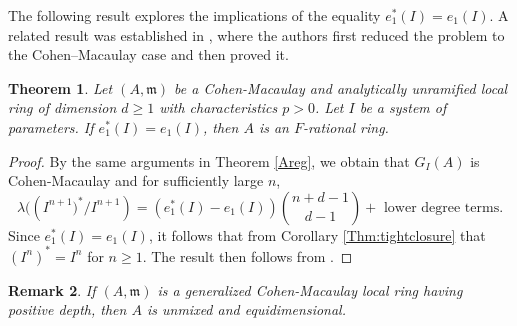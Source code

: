 \documentclass[11pt]{amsart}
\theoremstyle{plain}
\newtheorem{theorem}{Theorem}[section]
\newtheorem{remark}[theorem]{Remark}
\newcommand{\m}{\mathfrak{m}}
\theoremstyle{plain}
\begin{document}
The following result explores the implications of the equality ${e}^*_1(I)=e_1(I).$ A related result was established in \cite[Corollary 4.6]{saipriya}, where the authors first reduced the problem to the Cohen–Macaulay case and then proved it.
\begin{theorem}
\label{Frational}
     Let $(A,\m)$ be a Cohen-Macaulay and analytically unramified local ring of dimension $d\geq 1$ with characteristics $p>0$.  Let $I$ be a system of parameters. If ${e}^*_1(I)=e_1(I)$, then $A$ is an $F$-rational ring.
\end{theorem}
\begin{proof}
    By the same arguments in Theorem \ref{Areg}, we obtain that $G_I(A)$ is Cohen-Macaulay and for sufficiently large  $n$, $$\lambda(({I^{n+1})^*}/I^{n+1})=({e}^*_1({I})- e_1(I))\binom{n+d-1}{d-1}+\text{ lower degree terms}.$$  Since $e^*_1({I})=e_1(I)$, it follows that from Corollary \ref{Thm:tightclosure} that  $(I^n)^*=I^n$ for $n \geq 1$. The result then follows from \cite[Proposition 10.3.5]{Bruns}.
\end{proof}

\begin{remark}\cite[Lemma 1.2(iv)]{NVT} \label{gcm}
    If $(A,\m)$ is a generalized Cohen-Macaulay local ring having positive depth, then $A$ is unmixed and equidimensional.
\end{remark}
\end{document}
